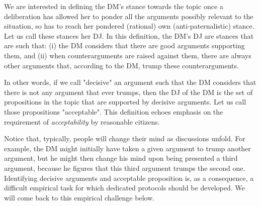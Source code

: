 \documentclass[version=3.21, pagesize, twoside=off, bibliography=totoc, DIV=calc, fontsize=12pt, a4paper, french, english]{scrartcl}
\begin{document}
We are interested in defining the \ac{DM}’s stance towards the topic once a deliberation has allowed her to ponder all the arguments possibly relevant to the situation, so has to reach her pondered (rational) own (anti-paternalistic) stance. Let us call these stances her \ac{DJ}. In this definition, the \ac{DM}’s \ac{DJ} are stances that are such that: (i) the \ac{DM} considers that there are good arguments supporting them, and (ii) when counterarguments are raised against them, there are always other arguments that, according to the \ac{DM}, trump these counterarguments.

In other words, if we call "decisive" an argument such that the \ac{DM} considers that there is not any argument that ever trumps, then the \ac{DJ} of the \ac{DM} is the set of propositions in the topic that are supported by decisive arguments. Let us call those propositions "acceptable". This definition echoes  emphasis on the requirement of \emph{acceptability} by reasonable citizens. 


Notice that, typically, people will change their mind as discussions unfold. For example, the \ac{DM} might initially have taken a given argument to trump another argument, but he might then change his mind upon being presented a third argument, because he figures that this third argument trumps the second one. Identifying decisive arguments and acceptable proposition is, as a consequence, a difficult empirical task for which dedicated protocols should be developed. We will come back to this empirical challenge below.
\end{document}
